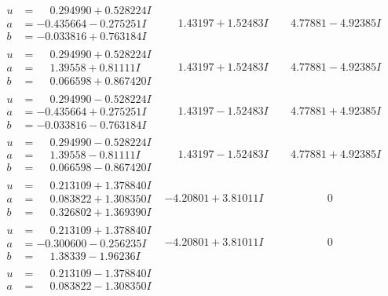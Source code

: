 \documentclass[1p]{elsarticle_modified}
\theoremstyle{definition}
\begin{document}
$$\begin{array}{c|c|c}
\begin{aligned}
u &= \phantom{-}0.294990 + 0.528224 I \\
a &= -0.435664 - 0.275251 I \\
b &= -0.033816 + 0.763184 I\end{aligned}
 & \phantom{-}1.43197 + 1.52483 I & \phantom{-}4.77881 - 4.92385 I \\ \hline\begin{aligned}
u &= \phantom{-}0.294990 + 0.528224 I \\
a &= \phantom{-}1.39558 + 0.81111 I \\
b &= \phantom{-}0.066598 + 0.867420 I\end{aligned}
 & \phantom{-}1.43197 + 1.52483 I & \phantom{-}4.77881 - 4.92385 I \\ \hline\begin{aligned}
u &= \phantom{-}0.294990 - 0.528224 I \\
a &= -0.435664 + 0.275251 I \\
b &= -0.033816 - 0.763184 I\end{aligned}
 & \phantom{-}1.43197 - 1.52483 I & \phantom{-}4.77881 + 4.92385 I \\ \hline\begin{aligned}
u &= \phantom{-}0.294990 - 0.528224 I \\
a &= \phantom{-}1.39558 - 0.81111 I \\
b &= \phantom{-}0.066598 - 0.867420 I\end{aligned}
 & \phantom{-}1.43197 - 1.52483 I & \phantom{-}4.77881 + 4.92385 I \\ \hline\begin{aligned}
u &= \phantom{-}0.213109 + 1.378840 I \\
a &= \phantom{-}0.083822 + 1.308350 I \\
b &= \phantom{-}0.326802 + 1.369390 I\end{aligned}
 & -4.20801 + 3.81011 I & \phantom{-0.000000 } 0 \\ \hline\begin{aligned}
u &= \phantom{-}0.213109 + 1.378840 I \\
a &= -0.300600 - 0.256235 I \\
b &= \phantom{-}1.38339 - 1.96236 I\end{aligned}
 & -4.20801 + 3.81011 I & \phantom{-0.000000 } 0 \\ \hline\begin{aligned}
u &= \phantom{-}0.213109 - 1.378840 I \\
a &= \phantom{-}0.083822 - 1.308350 I \\

\end{aligned}
\end{array}$$
\end{document}
